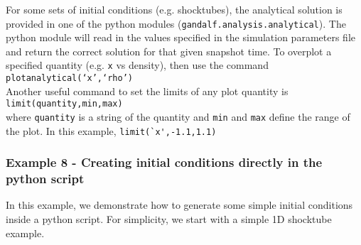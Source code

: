 \documentclass[a4paper]{article}
\newcommand{\var}[1]{\texttt{#1}}
\newcommand{\singlecommand}[1]{\\ \newline \indent \var{#1} \\ \newline \noindent}
\begin{document}





\noindent For some sets of initial conditions (e.g. shocktubes), the analytical solution is provided in one of the python modules (\var{gandalf.analysis.analytical}).  The python module will read in the values specified in the simulation parameters file and return the correct solution for that given snapshot time.  To overplot a specified quantity (e.g. \var{x} vs density), then use the command \singlecommand{plotanalytical(`x',`rho')}  Another useful command to set the limits of any plot quantity is \singlecommand{limit(quantity,min,max)} where \var{quantity} is a string of the quantity and \var{min} and \var{max} define the range of the plot.  In this example, \lstinline{limit(`x',-1.1,1.1)}


\subsubsection{Example 8 - Creating initial conditions directly in the python script}
In this example, we demonstrate how to generate some simple initial conditions inside a python script.  For simplicity, we start with a simple 1D shocktube example. \\
\end{document}
